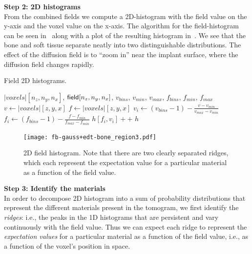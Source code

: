 \documentclass[pdflatex,sn-mathphys]{sn-jnl}%
\theoremstyle{thmstyleone}%
\theoremstyle{thmstyletwo}%
\theoremstyle{thmstylethree}%
\begin{document}
\vspace{\baselineskip}
\noindent\textbf{Step 2: 2D histograms} \\
From the combined fields we compute a 2D-histogram with the field value on the y-axis and the voxel
value on the x-axis.  The algorithm for the field-histogram can be seen in~
along with a plot of the resulting histogram in~. We see that the bone and soft tissue
separate neatly into two distinguishable distributions. The effect of the diffusion field is to ``zoom in'' near the implant surface,
where the diffusion field changes rapidly.


\begin{algorithm}
    \caption{Field 2D histograms.}
    \label{alg:field-hist}
    \begin{algorithmic}
         {$|voxels|[n_z,n_y,n_x]$, $\mathsf{field}[n_z,n_y,n_x]$, $v_{bins}$, $v_{min}$, $v_{max}$, $f_{bins}$, $f_{min}$, $f_{max}$}
                \State $v \gets |voxels|[z,y,x]$
                    \State $f \gets |voxels|[z,y,x]$
                        \State $v_i \gets (v_{bins} - 1) - \frac{v - v_{min}}{v_{max} - v_{min}}$
                        \State $f_i \gets (f_{bins} - 1) - \frac{f - f_{min}}{f_{max} - f_{min}}$
                        \State $h[f_i,v_i]{+}{+}$
                    \EndIf
                \EndIf
            \EndFor
            \State \Return $h$
        \EndFunction
    \end{algorithmic}
\end{algorithm}

\begin{figure}
    \texttt{[image: fb-gauss+edt-bone\_region3.pdf]}
    \caption{2D field histogram. Note that there are two clearly separated ridges, which each represent
      the expectation value for a particular material as a function of the field value.}
    \label{fig:field-hist}
\end{figure}

\vspace{\baselineskip}
\noindent\textbf{Step 3: Identify the materials} \\
In order to decompose 2D histogram into a sum of probability distributions that represent
the different materials present in the tomogram, we first identify the {\em ridges}:
i.e., the peaks in the 1D histograms that are persistent and vary continuously with the field value.
Thus we can expect each ridge to represent the {\em expectation values} for a particular material
as a function of the field value, i.e., as a function of the voxel's position in space.
\end{document}
